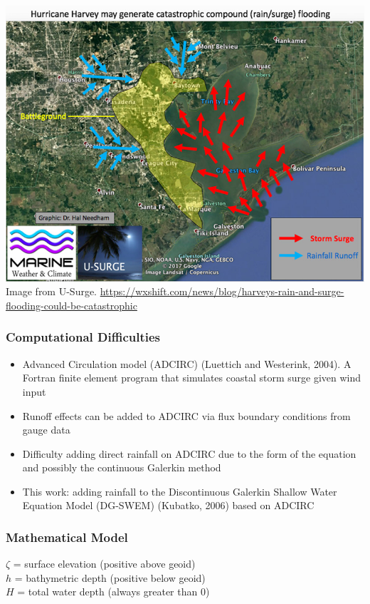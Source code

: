 \documentclass[10pt]{oden_beamer}
\begin{document}
\begin{frame}
  \frametitle{}
  \includegraphics[width=0.9\linewidth]{houston.jpg} \\
  \footnotesize
  Image from U-Surge. \url{https://wxshift.com/news/blog/harveys-rain-and-surge-flooding-could-be-catastrophic}
\end{frame}

\begin{frame}
  \frametitle{Computational Difficulties}
  \begin{itemize}
  \item Advanced Circulation model (ADCIRC) (Luettich and Westerink, 2004). A Fortran finite element program that simulates coastal storm surge given wind input
  \item Runoff effects can be added to ADCIRC via flux boundary conditions from gauge data
  \item Difficulty adding direct rainfall on ADCIRC due to the form of the equation and possibly the continuous Galerkin method
  \item This work: adding rainfall to the Discontinuous Galerkin Shallow Water Equation Model (DG-SWEM) (Kubatko, 2006) based on ADCIRC
  \end{itemize}
\end{frame}

\begin{frame}
  \frametitle{Mathematical Model}
  \begin{figure}[h]
    \centering
    \scalebox{.85}{ }%
  \end{figure}
  $\zeta$ = surface elevation (positive above geoid) \\
  $h$ = bathymetric depth (positive below geoid) \\
  $H$ = total water depth (always greater than 0)
\end{frame}
\end{document}
